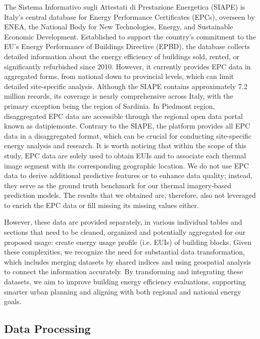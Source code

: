 \documentclass[preprint,12pt]{elsarticle}
\begin{document}
    The Sistema Informativo sugli Attestati di Prestazione Energetica (SIAPE) is Italy's central database for Energy Performance Certificates (EPCs), overseen by ENEA, the National Body for New Technologies, Energy, and Sustainable Economic Development\cite{lavecchia_predicting_2024}. Established to support the country’s commitment to the EU’s Energy Performance of Buildings Directive (EPBD)\cite{gatt_assessment_2020}, the database collects detailed information about the energy efficiency of buildings sold, rented, or significantly refurbished since 2010. However, it currently provides EPC data in aggregated forms, from national down to provincial levels, which can limit detailed site-specific analysis. 
    Although the SIAPE contains approximately 7.2 million records, its coverage is nearly comprehensive across Italy, with the primary exception being the region of Sardinia.
    In Piedmont region, disaggregated EPC data are accessible through the regional open data portal known as datipiemonte. Contrary to the SIAPE, the platform provides all EPC data in a disaggregated format, which can be crucial for conducting site-specific energy analysis and research. It is worth noticing that within the scope of this study, EPC data are solely used to obtain EUIs and to associate each thermal image segment with its corresponding geographic location. We do not use EPC data to derive additional predictive features or to enhance data quality; instead, they serve as the ground truth benchmark for our thermal imagery-based prediction models. The results that we obtained are, therefore, also not leveraged to enrich the EPC data or fill missing its missing values either.
    
    However, these data are provided separately, in various individual tables and sections that need to be cleaned, organized and potentially aggregated for our proposed usage: create energy usage profile (i.e. EUIs) of building blocks. Given these complexities, we recognize the need for substantial data transformation, which includes merging datasets by shared indices and using geospatial analysis to connect the information accurately. By transforming and integrating these datasets, we aim to improve building energy efficiency evaluations, supporting smarter urban planning and aligning with both regional and national energy goals.
    
   
\subsection{Data Processing}
\end{document}
